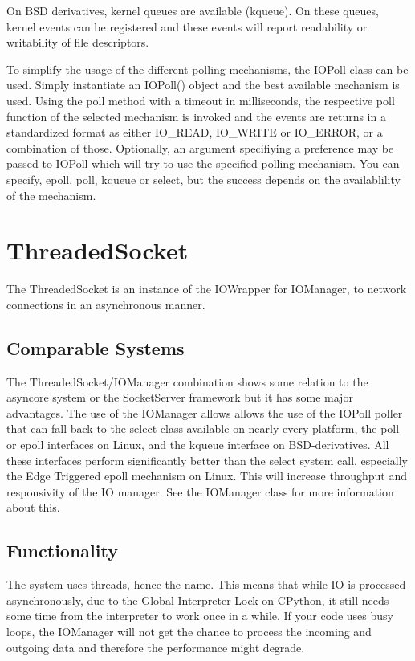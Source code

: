 \documentclass[a4paper, 10pt, oneside]{article}
\begin{document}
On BSD derivatives, kernel queues are available (kqueue). On these queues,
kernel events can be registered and these events will report readability or
writability of file descriptors.

To simplify the usage of the different polling mechanisms, the IOPoll class can
be used. Simply instantiate an IOPoll() object and the best available mechanism
is used. Using the poll method with a timeout in milliseconds, the respective
poll function of the selected mechanism is invoked and the events are returns in
a standardized format as either IO\_READ, IO\_WRITE or IO\_ERROR, or a combination
of those. Optionally, an argument specifiying a preference may be passed to
IOPoll which will try to use the specified polling mechanism. You can specify,
epoll, poll, kqueue or select, but the success depends on the availablility of
the mechanism.

\section{ThreadedSocket}
The ThreadedSocket is an instance of the IOWrapper for IOManager, to
network connections in an asynchronous manner.\\

\subsection{Comparable Systems}
The ThreadedSocket/IOManager combination shows some relation to the asyncore
system or the SocketServer framework but it has some major advantages. The use
of the IOManager allows allows the use of the IOPoll poller that can fall back
to the select class available on nearly every platform, the poll or epoll
interfaces on Linux, and the kqueue interface on BSD-derivatives. All these
interfaces perform significantly better than the select system call, especially
the Edge Triggered epoll mechanism on Linux. This will increase throughput and
responsivity of the IO manager. See the IOManager class for more information
about this.

\subsection{Functionality}
The system uses threads, hence the name. This means that while IO is processed
asynchronously, due to the Global Interpreter Lock on CPython, it still needs
some time from the interpreter to work once in a while. If your code uses busy
loops, the IOManager will not get the chance to process the incoming and 
outgoing data and therefore the performance might degrade.\\
\end{document}
